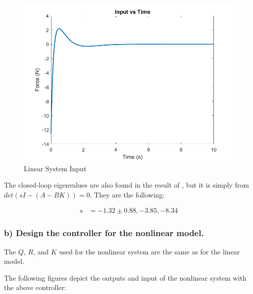 \begin{figure}[!ht]
    \centering
    \includegraphics[width=\linewidth]{figs/sf_lin_input.png}
    \caption{Linear System Input}
    \label{}
\end{figure}

\clearpage

The closed-loop eigenvalues are also found in the result of , but it is simply from $det(sI-(A-BK))=0$. They are the following:

\begin{equation*}
    \begin{split}
        s & = -1.32\pm0.88, -3.85, -8.34
    \end{split}
\end{equation*}

\subsubsection*{b) Design the controller for the nonlinear model.}

The $Q$, $R$, and $K$ used for the nonlinear system are the same as for the linear model.

The following figures depict the outputs and input of the nonlinear system with the above controller:


